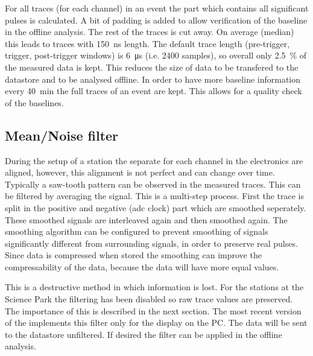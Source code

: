 \cite{oostenbrugge2014daq}

For all traces (for each channel) in an event the part which contains all significant pulses is calculated. A bit of padding is added to allow verification of the baseline in the offline analysis. The rest of the traces is cut away. On average (median) this leads to traces with \SI{150}{\ns} length. The default trace length (pre-trigger, trigger, post-trigger windows) is \SI{6}{\micro\second} (i.e. 2400 samples), so overall only \SI{2.5}{\percent} of the measured data is kept. This reduces the size of data to be transfered to the datastore and to be analysed offline. In order to have more baseline information every \SI{40}{\minute} the full traces of an event are kept. This allows for a quality check of the baselines.



\subsection{Mean/Noise filter}

During the setup of a station the separate \adcs for each channel in the \hisparc electronics are aligned, however, this alignment is not perfect and can change over time. Typically a saw-tooth pattern can be observed in the measured traces. This can be filtered by averaging the signal. This is a multi-step process. First the trace is split in the positive and negative (adc clock) part which are smoothed seperately. These smoothed signals are interleaved again and then smoothed again. The smoothing algorithm can be configured to prevent smoothing of signals significantly different from surrounding signals, in order to preserve real pulses. Since data is compressed when stored the smoothing can improve the compressability of the data, because the data will have more equal values.

This is a destructive method in which information is lost. For the \hisparc stations at the Science Park the filtering has been disabled so raw trace values are preserved. The importance of this is described in the next section. The most recent version of the \hisparc \daq [to be released] implements this filter only for the display on the \hisparc PC. The data will be sent to the datastore unfiltered. If desired the filter can be applied in the offline analysis.

